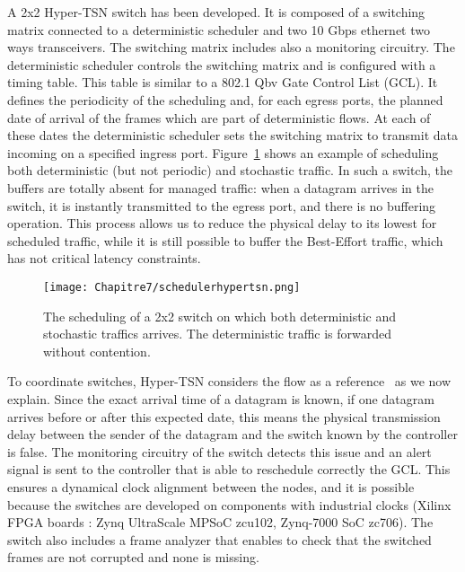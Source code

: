 A 2x2 Hyper-TSN switch has been developed. It is composed of a switching matrix connected to a deterministic scheduler and two 10 Gbps ethernet two ways transceivers. The switching matrix includes also a monitoring circuitry. The deterministic scheduler controls the switching matrix and is configured with a timing table. This table is similar to a 802.1 Qbv Gate Control List (GCL). It defines the periodicity of the scheduling and, for each egress ports, the planned date of arrival of the frames which are part of deterministic flows. At each of these dates the deterministic scheduler sets the switching matrix to transmit data incoming on a specified ingress port. Figure~\ref{fig:schedulehtsn} shows an example of scheduling both deterministic (but not periodic) and stochastic traffic.
 In such a switch, the buffers are totally absent for managed traffic: when a datagram arrives in the switch, it is instantly transmitted to the egress port, and there is no buffering operation. This process allows us to reduce the physical delay to its lowest for scheduled traffic, while it is still possible to buffer the Best-Effort traffic, which has not critical latency constraints.
\begin{center}

\begin{figure}[h]
  \centering
\texttt{[image: Chapitre7/schedulerhypertsn.png]}
\caption{ The scheduling of a 2x2 switch on which both deterministic and stochastic traffics arrives. The deterministic traffic is forwarded without contention.}
\label{fig:schedulehtsn}
\end{figure}
\end{center}

To coordinate switches, Hyper-TSN considers the flow as a reference~\cite{leclerc2020optical} as we now explain. Since the exact arrival time of a datagram is known, if one datagram arrives before or after this expected date, this means the physical transmission delay between the sender of the datagram and the switch known by the controller is false. The monitoring circuitry of the switch detects this issue and an alert signal is sent to the controller that is able to reschedule correctly the GCL.
This ensures a dynamical clock alignment between the nodes, and it is possible because the switches are developed on components with industrial clocks (Xilinx FPGA boards : Zynq UltraScale MPSoC zcu102, Zynq-7000 SoC zc706). 
The switch also includes a frame analyzer that enables to check that the switched frames are not corrupted and none is missing.

